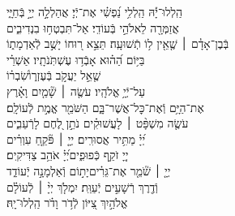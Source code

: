 \documentclass[twoside, openany, parskip=half, 11pt]{book}
\begin{document}
\begin{narrow}

הַֽלְלוּ־יָ֡הּ\hfill \break
הַֽלְלִ֥י נַ֝פְשִׁ֗י אֶת־יְֿיָ׃ \hfill
אֲהַלְלָ֣ה יְיָ֣ בְּֿחַיָּ֑י \\ אֲזַמְּרָ֖ה לֵאלֹהַ֣י בְּֿעוֹדִֽי׃ \hfill
אַל־תִּבְטְח֥וּ בִנְדִיבִ֑ים \\ בְּֿבֶן־אָדָ֓ם ׀ שֶׁ֤אֵ֖ין ל֥וֹ תְֿשׁוּעָֽה׃ \hfill
תֵּצֵ֣א ר֭וּחוֹ יָשֻׁ֣ב לְֿאַדְמָת֑וֹ \\ בַּיּ֥וֹם הַ֝ה֗וּא אָבְֿד֥וּ עֶשְׁתֹּֽנֹתָֽיו׃ \hfill
אַשְׁרֵ֗י\\ שֶׁ֤אֵ֣ל יַעֲקֹ֣ב בְּֿעֶזְר֑וֹ\hfill שִׂ֝בְר֗וֹ\\ עַל־יְֿיָ֥ אֱלֹהָֽיו׃ \hfill
עֹשֶׂ֤ה ׀ שָׁ֘מַ֤יִם וָאָ֗רֶץ\\ אֶת־הַיָּ֥ם וְֿאֶת־כׇּל־אֲשֶׁר־בָּ֑ם \hfill הַשֹּׁמֵ֖ר אֱמֶ֣ת לְֿעוֹלָֽם׃ \\
עֹשֶׂ֤ה מִשְׁפָּ֨ט ׀ לָעֲשׁוּקִ֗ים \hfill נֹתֵ֣ן לֶ֭חֶם לָרְֿעֵבִ֑ים\\ יְ֝יָ֗ מַתִּ֥יר אֲסוּרִֽים׃ \hfill
יְיָ֤ ׀ פֹּ֘קֵ֤חַ עִוְרִ֗ים\\ יְיָ֭ זֹקֵ֣ף כְּֿפוּפִ֑ים\hfill יְ֝יָ֗ אֹהֵ֥ב צַדִּיקִֽים׃ \\
יְיָ֤ ׀ שֹׁ֘מֵ֤ר אֶת־גֵּרִ֗ים\hfill יָת֣וֹם וְֿאַלְמָנָ֣ה יְֿעוֹדֵ֑ד\\ וְֿדֶ֖רֶךְ רְֿשָׁעִ֣ים יְֿעַוֵּֽת׃ \hfill
יִמְלֹ֤ךְ יְיָ֨ ׀ לְֿעוֹלָ֗ם\\ אֱלֹהַ֣יִךְ צִ֭יּוֹן לְֿדֹ֥ר וָדֹ֗ר \hfill הַֽלְלוּ־יָֽהּ׃ \\



\end{narrow}
\end{document}
